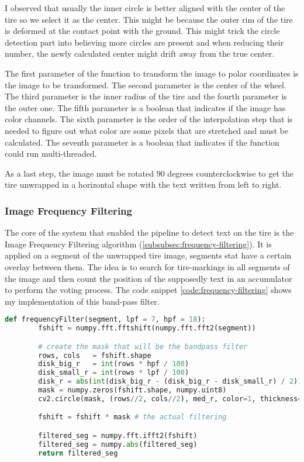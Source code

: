 I observed that usually the inner circle is better aligned with the center of the tire so we select it as the center. This might be because the outer rim of the tire is deformed at the contact point with the ground. This might trick the circle detection part into believing more circles are present and when reducing their number, the newly calculated center might drift away from the true center.

The first parameter of the function to transform the image to polar coordinates is the image to be transformed. The second parameter is the center of the wheel. The third parameter is the inner radius of the tire and the fourth parameter is the outer one. The fifth parameter is a boolean that indicates if the image has color channels. The sixth parameter is the order of the interpolation step that is needed to figure out what color are some pixels that are stretched and must be calculated. The seventh parameter is a boolean that indicates if the function could run multi-threaded.

As a last step, the image must be rotated 90 degrees counterclockwise to get the tire unwrapped in a horizontal shape with the text written from left to right.

\subsubsection{Image Frequency Filtering}

The core of the system that enabled the pipeline to detect text on the tire is the Image Frequency Filtering algorithm (\ref{subsubsec:frequency-filtering}). It is applied on a segment of the unwrapped tire image, segments stat have a certain overlay between them. The idea is to search for tire-markings in all segments of the image and then count the position of the supposedly text in an accumulator to perform the voting process. The code snippet \ref{code:frequency-filtering} shows my implementation of this band-pass filter.

\begin{lstlisting}[language=Python, label=code:frequency-filtering, caption={Image Frequency Filtering}]
    def frequencyFilter(segment, lpf = 7, hpf = 18):
        fshift = numpy.fft.fftshift(numpy.fft.fft2(segment))

        # create the mask that will be the bandpass filter
        rows, cols   = fshift.shape
        disk_big_r   = int(rows * hpf / 100)
        disk_small_r = int(rows * lpf / 100)
        disk_r = abs(int(disk_big_r - (disk_big_r - disk_small_r) / 2))
        mask = numpy.zeros(fshift.shape, numpy.uint8)
        cv2.circle(mask, (rows//2, cols//2), med_r, color=1, thickness=abs(big_r - small_r))

        fshift = fshift * mask # the actual filtering

        filtered_seg = numpy.fft.ifft2(fshift)
        filtered_seg = numpy.abs(filtered_seg)
        return filtered_seg
\end{lstlisting}

